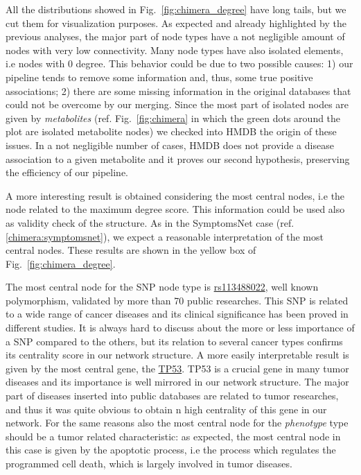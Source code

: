 \documentclass{standalone}
\begin{document}
All the distributions showed in Fig.~\ref{fig:chimera_degree} have long tails, but we cut them for visualization purposes.
As expected and already highlighted by the previous analyses, the major part of node types have a not negligible amount of nodes with very low connectivity.
Many node types have also isolated elements, i.e nodes with $0$ degree.
This behavior could be due to two possible causes: 1) our pipeline tends to remove some information and, thus, some true positive associations; 2) there are some missing information in the original databases that could not be overcome by our merging.
Since the most part of isolated nodes are given by \emph{metabolites} (ref. Fig.~\ref{fig:chimera} in which the green dots around the plot are isolated metabolite nodes) we checked into HMDB the origin of these issues.
In a not negligible number of cases, HMDB does not provide a disease association to a given metabolite and it proves our second hypothesis, preserving the efficiency of our pipeline.

A more interesting result is obtained considering the most central nodes, i.e the node related to the maximum degree score.
This information could be used also as validity check of the structure.
As in the \textsf{SymptomsNet} case (ref. \ref{chimera:symptomsnet}), we expect a reasonable interpretation of the most central nodes.
These results are shown in the yellow box of Fig.~\ref{fig:chimera_degree}.

The most central node for the SNP node type is \href{https://www.ncbi.nlm.nih.gov/snp/rs113488022}{\textsf{rs113488022}}, well known polymorphism, validated by more than 70 public researches.
This SNP is related to a wide range of cancer diseases and its clinical significance has been proved in different studies.
It is always hard to discuss about the more or less importance of a SNP compared to the others, but its relation to several cancer types confirms its centrality score in our network structure.
A more easily interpretable result is given by the most central gene, the \href{https://ghr.nlm.nih.gov/gene/TP53}{\textsf{TP53}}.
\textsf{TP53} is a crucial gene in many tumor diseases and its importance is well mirrored in our network structure.
The major part of diseases inserted into public databases are related to tumor researches, and thus it was quite obvious to obtain n high centrality of this gene in our network.
For the same reasons also the most central node for the \emph{phenotype} type should be a tumor related characteristic: as expected, the most central node in this case is given by the \textsf{apoptotic process}, i.e the process which regulates the programmed cell death, which is largely involved in tumor diseases.
\end{document}
